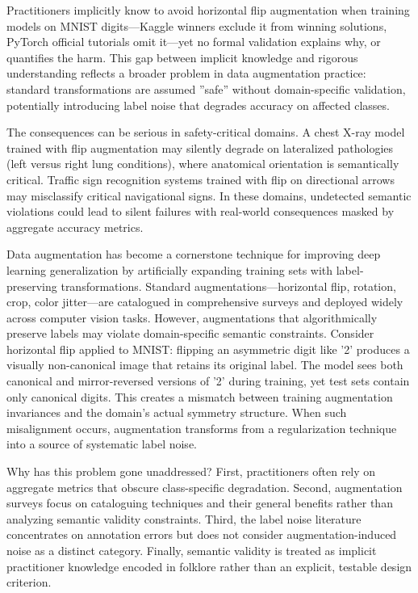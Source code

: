 
Practitioners implicitly know to avoid horizontal flip augmentation when training models on MNIST digits---Kaggle winners exclude it from winning solutions, PyTorch official tutorials omit it---yet no formal validation explains why, or quantifies the harm. This gap between implicit knowledge and rigorous understanding reflects a broader problem in data augmentation practice: standard transformations are assumed ''safe'' without domain-specific validation, potentially introducing label noise that degrades accuracy on affected classes.

The consequences can be serious in safety-critical domains. A chest X-ray model trained with flip augmentation may silently degrade on lateralized pathologies (left versus right lung conditions), where anatomical orientation is semantically critical. Traffic sign recognition systems trained with flip on directional arrows may misclassify critical navigational signs. In these domains, undetected semantic violations could lead to silent failures with real-world consequences masked by aggregate accuracy metrics.

Data augmentation has become a cornerstone technique for improving deep learning generalization by artificially expanding training sets with label-preserving transformations. Standard augmentations---horizontal flip, rotation, crop, color jitter---are catalogued in comprehensive surveys and deployed widely across computer vision tasks. However, augmentations that algorithmically preserve labels may violate domain-specific semantic constraints. Consider horizontal flip applied to MNIST: flipping an asymmetric digit like '2' produces a visually non-canonical image that retains its original label. The model sees both canonical and mirror-reversed versions of '2' during training, yet test sets contain only canonical digits. This creates a mismatch between training augmentation invariances and the domain's actual symmetry structure. When such misalignment occurs, augmentation transforms from a regularization technique into a source of systematic label noise.

Why has this problem gone unaddressed? First, practitioners often rely on aggregate metrics that obscure class-specific degradation. Second, augmentation surveys focus on cataloguing techniques and their general benefits rather than analyzing semantic validity constraints. Third, the label noise literature concentrates on annotation errors but does not consider augmentation-induced noise as a distinct category. Finally, semantic validity is treated as implicit practitioner knowledge encoded in folklore rather than an explicit, testable design criterion.

